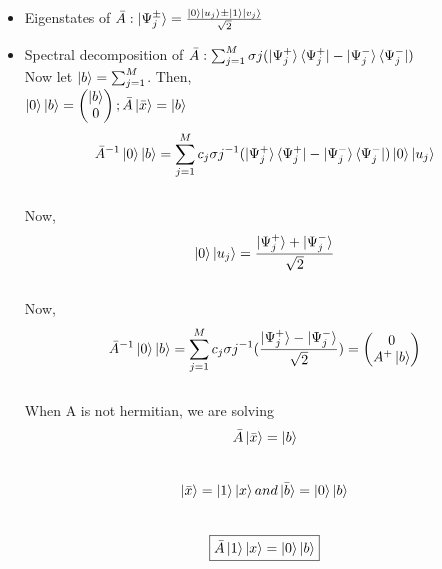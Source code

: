 \documentclass[11.5pt, paper=a4]{article}
\theoremstyle{definition}
\numberwithin{theorem}{section}
\begin{document}
\begin{itemize}
    \item Eigenstates of $\bar{A} : \ket{\Psi_{j}^{\pm}} = \frac{\ket{0} \ket{u_{j}} \pm \ket{1} \ket{v_{j}}}{\sqrt{2}}$
    \item Spectral decomposition of $\bar{A} : \sum_{j=1}^{M}\sigma{j}(\ket{\Psi_{j}^{+}}\bra{\Psi_{j}^{+}} - \ket{\Psi_{j}^{-}}\bra{\Psi_{j}^{-}})$\\
    Now let $ \ket{b} = \sum_{j=1}^{M}$. Then,\\
    $ \ket{0}\ket{b} = \begin{pmatrix} \ket{b}\\ 0 \end{pmatrix} ; \bar{A}\ket{\bar{x}} = \ket{b}$\\
    $$ \bar{A}^{-1}\ket{0}\ket{b} = \sum_{j=1}^{M}c_{j}\sigma{j}^{-1}(\ket{\Psi_{j}^{+}}\bra{\Psi_{j}^{+}} - \ket{\Psi_{j}^{-}}\bra{\Psi_{j}^{-}})\ket{0}\ket{u_{j}}$$\\Now,
    $$\ket{0}\ket{u_{j}} = \frac{\ket{\Psi_{j}^{+}} + \ket{\Psi_{j}^{-}}}{\sqrt{2}}$$\\ Now,
    $$ \bar{A}^{-1}\ket{0}\ket{b} = \sum_{j=1}^{M}c_{j}\sigma{j}^{-1}(\frac{\ket{\Psi_{j}^{+}} - \ket{\Psi_{j}^{-}}}{\sqrt{2}}) = \begin{pmatrix} 0 \\ A^{+}\ket{b} \end{pmatrix}$$\\
    When A is not hermitian, we are solving $$\bar{A}\ket{\bar{x}} = \ket{b}$$\\$$\ket{\bar{x}} = \ket{1}\ket{x} and \ket{\bar{b}} = \ket{0}\ket{b}$$\\
    $$\boxed{\bar{A}\ket{1}\ket{x} = \ket{0}\ket{b}}$$
\end{itemize}
\end{document}
